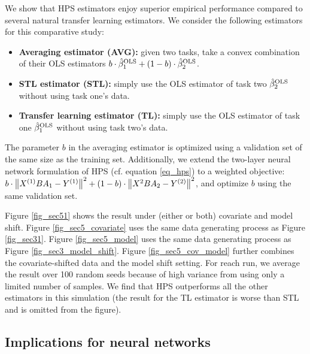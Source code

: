 We show that HPS estimators enjoy superior empirical performance compared to several natural transfer learning estimators.
We consider the following estimators for this comparative study:
\begin{itemize}
    \item {\bf Averaging estimator (AVG):} given two tasks, take a convex combination of their OLS estimators $b \cdot \hat{\beta}^{\textup{OLS}}_1 + (1 - b) \cdot \hat{\beta}^{\textup{OLS}}_2$.
    \item {\bf STL estimator (STL):} simply use the OLS estimator of task two $\hat{\beta}^{\textup{OLS}}_2$ without using task one's data.
    \item {\bf Transfer learning estimator (TL):} simply use the OLS estimator of task one $\hat{\beta}^{\textup{OLS}}_1$ without using task two's data.
\end{itemize}
The parameter $b$ in the averaging estimator is optimized using a validation set of the same size as the training set.
Additionally, we extend the two-layer neural network formulation of HPS (cf. equation \eqref{eq_hps}) to a weighted objective:
$b \cdot \left\| X^{(1)} B A_1 - Y^{(1)} \right\|^2 + (1 - b) \cdot  \left\| X^{2} B A_2 - Y^{(2)} \right\|^2$, and optimize $b$ using the same validation set.

Figure \ref{fig_sec51} shows the result under (either or both) covariate and model shift.
Figure \ref{fig_sec5_covariate} uses the same data generating process as Figure \ref{fig_sec31}.
Figure \ref{fig_sec5_model} uses the same data generating process as Figure \ref{fig_sec3_model_shift}.
Figure \ref{fig_sec5_cov_model} further combines the covariate-shifted data and the model shift setting.
For reach run, we average the result over 100 random seeds because of high variance from using only a limited number of samples.
We find that HPS outperforms all the other estimators in this simulation (the result for the TL estimator is worse than STL and is omitted from the figure).



\subsection{Implications for neural networks}


